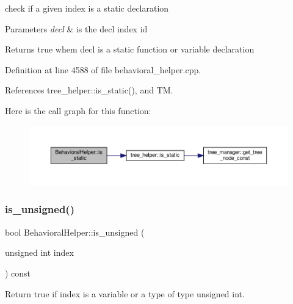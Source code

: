 check if a given index is a static declaration 


\begin{DoxyParams}{Parameters}
{\em decl} & is the decl index id \\
\hline
\end{DoxyParams}
\begin{DoxyReturn}{Returns}
true whem decl is a static function or variable declaration 
\end{DoxyReturn}


Definition at line 4588 of file behavioral\+\_\+helper.\+cpp.



References tree\+\_\+helper\+::is\+\_\+static(), and TM.

Here is the call graph for this function\+:
\nopagebreak
\begin{figure}[H]
\begin{center}
\leavevmode
\includegraphics[width=350pt]{dd/db2/classBehavioralHelper_a8195871ec6398c224dfbda443db4855f_cgraph}
\end{center}
\end{figure}
\mbox{\label{classBehavioralHelper_a3f1e46296fca88d2d3cf26c121cd7c0d}} 
\subsubsection{\texorpdfstring{is\+\_\+unsigned()}{is\_unsigned()}}
{\footnotesize\ttfamily bool Behavioral\+Helper\+::is\+\_\+unsigned (\begin{DoxyParamCaption}\item[{unsigned int}]{index }\end{DoxyParamCaption}) const\hspace{0.3cm}{\ttfamily [virtual]}}



Return true if index is a variable or a type of type unsigned int. 



